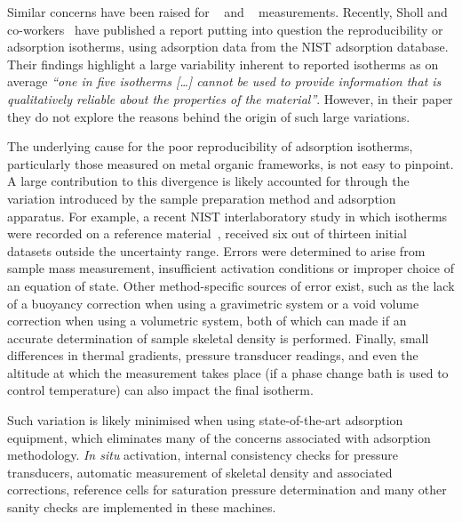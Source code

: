 Similar concerns have been
raised for ~\cite{broomIrreproducibilityHydrogenStorage2016}
and ~\cite{espinalMeasurementStandardsData2013} measurements.
Recently, Sholl and co-workers~\cite{parkHowReproducibleAre2017}
have published a report putting into question the reproducibility
or adsorption isotherms, using  adsorption data from the
NIST adsorption database. Their findings highlight a large
variability inherent
to reported isotherms as on average \textit{``one in five 
	isotherms [\ldots] cannot be used to provide information that
	is qualitatively reliable about the properties of the material''}.
However, in their paper they do not explore the reasons behind the
origin of such large variations.

The underlying cause for the poor reproducibility of adsorption
isotherms, particularly those measured on metal organic frameworks,
is not easy to pinpoint. A large contribution to this divergence
is likely accounted for through the variation introduced by the
sample preparation method and adsorption apparatus.
For example, a recent NIST interlaboratory study in which 
isotherms were recorded on a reference
material~\cite{nguyenReferenceHighpressureCO22018}, received six
out of thirteen initial datasets outside the uncertainty range.
Errors were determined to arise from sample mass measurement,
insufficient activation conditions or improper choice of an
equation of state. Other method-specific sources of error exist,
such as the lack of a buoyancy correction when using a
gravimetric system or a void volume correction when using
a volumetric system, both of which can made if an accurate
determination of sample skeletal density is performed. Finally,
small differences in thermal gradients, pressure transducer
readings, and even the altitude at which the measurement takes place
(if a phase change bath is used to control temperature)
can also impact the final isotherm.

Such variation is likely minimised when using state-of-the-art
adsorption equipment, which eliminates many of the concerns
associated with adsorption methodology. \textit{In situ}
activation, internal consistency checks for pressure transducers,
automatic measurement of skeletal density and associated
corrections, reference cells for saturation pressure determination
and many other sanity checks are implemented in these machines.

